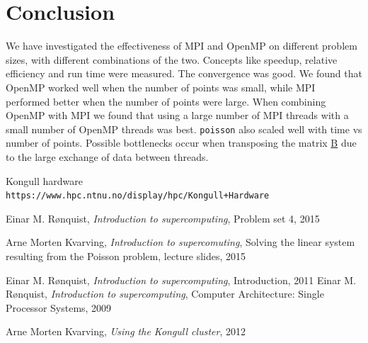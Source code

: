 \documentclass{article}
\begin{document}
\section{Conclusion}

We have investigated the effectiveness of MPI and OpenMP on different problem sizes, with different combinations of the two. Concepts like speedup, relative efficiency and run time were measured. The convergence was good. We found that OpenMP worked well when the number of points was small, while MPI performed better when the number of points were large. When combining OpenMP with MPI we found that using a large number of MPI threads with a small number of OpenMP threads was best. \texttt{poisson} also scaled well with time vs number of points. Possible bottlenecks occur when transposing the matrix \underline{B} due to the large exchange of data between threads. 

\vspace{5cm}

\begin{thebibliography}{9}


    Kongull hardware\\
    \texttt{https://www.hpc.ntnu.no/display/hpc/Kongull+Hardware}

    Einar M. Rønquist,
    \emph{Introduction to supercomputing},
    Problem set 4,
      2015
      
      
    Arne Morten Kvarving,
    \emph{Introduction to supercomuting},
    Solving the linear system resulting from the Poisson problem, lecture slides,
    2015

  
  Einar M. Rønquist,
  \emph{Introduction to supercomputing},
Introduction,
  2011
  Einar M. Rønquist,
  \emph{Introduction to supercomputing},
  Computer Architecture: Single Processor Systems,
  2009
  
  
  Arne Morten Kvarving,
  \emph{Using the Kongull cluster},
  2012


  
\end{thebibliography}
%
\end{document}
